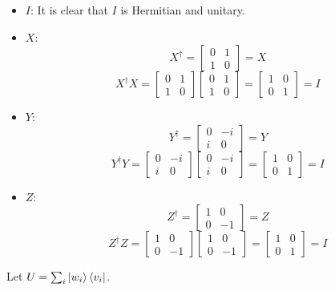 \documentclass{homeworg}
\begin{document}
\exercise*
\begin{itemize}
    \item $I$: It is clear that $I$ is Hermitian and unitary.
   \item $X$:
   \[X^\dagger=\begin{bmatrix} 0 & 1 \\ 1 & 0 \end{bmatrix}=X\]
   \[X^\dagger X=\begin{bmatrix} 0 & 1 \\ 1 & 0 \end{bmatrix}\begin{bmatrix} 0 & 1 \\ 1 & 0 \end{bmatrix}=\begin{bmatrix} 1 & 0 \\ 0 & 1 \end{bmatrix}=I\]
   \item $Y$:
   \[Y^\dagger=\begin{bmatrix} 0 & -i \\ i & 0 \end{bmatrix}=Y\]
   \[Y^\dagger Y=\begin{bmatrix} 0 & -i \\ i & 0 \end{bmatrix}\begin{bmatrix} 0 & -i \\ i & 0 \end{bmatrix}=\begin{bmatrix} 1 & 0 \\ 0 & 1 \end{bmatrix}=I\]
   \item $Z$:
   \[Z^\dagger=\begin{bmatrix} 1 & 0 \\ 0 & -1 \end{bmatrix}=Z\]
   \[Z^\dagger Z=\begin{bmatrix} 1 & 0 \\ 0 & -1 \end{bmatrix}\begin{bmatrix} 1 & 0 \\ 0 & -1 \end{bmatrix}=\begin{bmatrix} 1 & 0 \\ 0 & 1 \end{bmatrix}=I\]
\end{itemize}

\exercise*
Let $U=\sum_i\ket{w_i}\bra{v_i}$.
\end{document}
